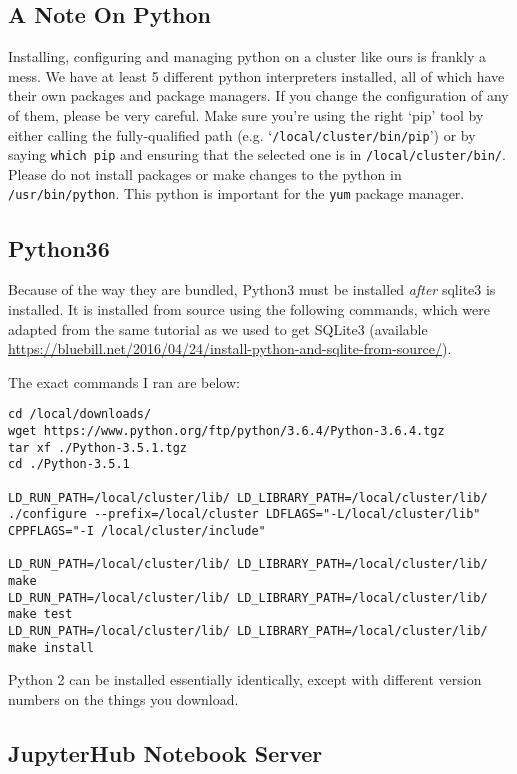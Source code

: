\documentclass[]{book}
\theoremstyle{definition}
\theoremstyle{definition}
\theoremstyle{definition}
\theoremstyle{remark}
\begin{document}
\subsection{A Note On Python}\label{a-note-on-python}

Installing, configuring and managing python on a cluster like ours is
frankly a mess. We have at least 5 different python interpreters
installed, all of which have their own packages and package managers. If
you change the configuration of any of them, please be very careful.
Make sure you're using the right `pip' tool by either calling the
fully-qualified path (e.g. `\texttt{/local/cluster/bin/pip}') or by
saying \texttt{which\ pip} and ensuring that the selected one is in
\texttt{/local/cluster/bin/}. Please do not install packages or make
changes to the python in \texttt{/usr/bin/python}. This python is
important for the \texttt{yum} package manager.

\subsection{Python36}\label{python36}

Because of the way they are bundled, Python3 must be installed
\emph{after} sqlite3 is installed. It is installed from source using the
following commands, which were adapted from the same tutorial as we used
to get SQLite3 (available
\href{Here}{https://bluebill.net/2016/04/24/install-python-and-sqlite-from-source/}).

The exact commands I ran are below:

\begin{verbatim}
cd /local/downloads/
wget https://www.python.org/ftp/python/3.6.4/Python-3.6.4.tgz
tar xf ./Python-3.5.1.tgz
cd ./Python-3.5.1

LD_RUN_PATH=/local/cluster/lib/ LD_LIBRARY_PATH=/local/cluster/lib/ ./configure --prefix=/local/cluster LDFLAGS="-L/local/cluster/lib" CPPFLAGS="-I /local/cluster/include"

LD_RUN_PATH=/local/cluster/lib/ LD_LIBRARY_PATH=/local/cluster/lib/ make
LD_RUN_PATH=/local/cluster/lib/ LD_LIBRARY_PATH=/local/cluster/lib/ make test
LD_RUN_PATH=/local/cluster/lib/ LD_LIBRARY_PATH=/local/cluster/lib/ make install
\end{verbatim}

Python 2 can be installed essentially identically, except with different
version numbers on the things you download.

\subsection{JupyterHub Notebook
Server}\label{jupyterhub-notebook-server}
\end{document}

